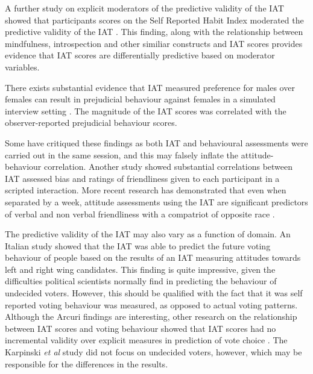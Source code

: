 A further study on explicit moderators of the predictive validity of the IAT showed that participants scores on the Self Reported Habit Index moderated the predictive validity of the IAT \cite{Conner2007}. This finding, along with the relationship between mindfulness, introspection and other similiar constructs and IAT scores provides evidence that IAT scores are differentially predictive based on moderator variables. 


There exists substantial evidence that IAT measured preference for males over females  can result in prejudicial behaviour against females in a simulated interview setting \cite{Greenwald2000,Heider2007}. The magnitude of the IAT scores was correlated with the observer-reported prejudicial behaviour scores. 

Some have critiqued these findings as both IAT and behavioural assessments were carried out in the same session, and this may falsely inflate the attitude-behaviour correlation. Another study \cite{McConnell2001} showed substantial correlations between IAT assessed bias and ratings of friendliness given to each participant in a scripted interaction. More recent research has demonstrated that even when separated by a week, attitude assessments using the IAT are significant predictors of verbal and non verbal friendliness with a compatriot of opposite race \cite{Heider2007}. 

The predictive validity of the IAT may also vary as a function of domain. An Italian study \cite{Arcuri2008} showed that the IAT was able to predict the future voting behaviour of people based on the results of an IAT measuring attitudes towards left and right wing candidates. This finding is quite impressive, given the difficulties political scientists normally find in predicting the behaviour of undecided voters. However, this should be qualified with the fact that it was self reported voting behaviour was measured, as opposed to actual voting patterns. Although the Arcuri findings are interesting, other research on  the relationship between IAT scores and voting behaviour showed that IAT scores had no incremental validity over explicit measures in prediction of vote choice \cite{Karpinski2005}. The Karpinski \textit{et al } study did not focus on undecided voters, however, which may be responsible for the differences in the results. 

